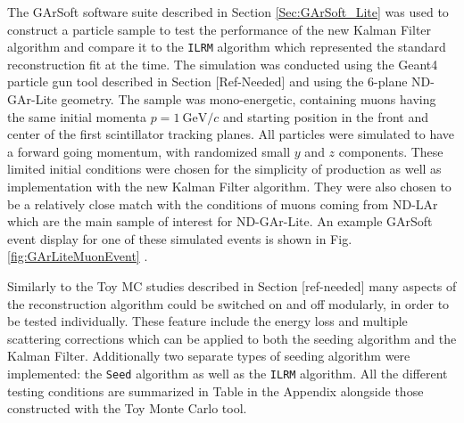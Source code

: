 The GArSoft software suite described in Section \ref{Sec:GArSoft_Lite} was used to construct a particle sample to test the performance of the new Kalman Filter algorithm and compare it to the \texttt{ILRM} algorithm which represented the standard reconstruction fit at the time. The simulation was conducted using the Geant4 particle gun tool described in Section [Ref-Needed] and using the 6-plane ND-GAr-Lite geometry. The sample was mono-energetic, containing muons having the same initial momenta $p=1\ \text{GeV}/c$ and starting position in the front and center of the first scintillator tracking planes.  All particles were simulated to have a forward going momentum, with randomized small $y$ and $z$ components. These limited initial conditions were chosen for the simplicity of production as well as implementation with the new Kalman Filter algorithm. They were also chosen to be a relatively close match with the conditions of muons coming from ND-LAr which are the main sample of interest for ND-GAr-Lite. An example GArSoft event display for one of these simulated events is shown in Fig. \ref{fig:GArLiteMuonEvent} .  

Similarly to the Toy MC studies described in Section [ref-needed] many aspects of the reconstruction algorithm could be switched on and off modularly, in order to be tested individually. These feature include the energy loss and multiple scattering corrections which can be applied to both the seeding algorithm and the Kalman Filter. Additionally two separate types of seeding algorithm were implemented: the \texttt{Seed} algorithm as well as the \texttt{ILRM} algorithm. All the different testing conditions are summarized in Table in the Appendix alongside those constructed with the Toy Monte Carlo tool. 

